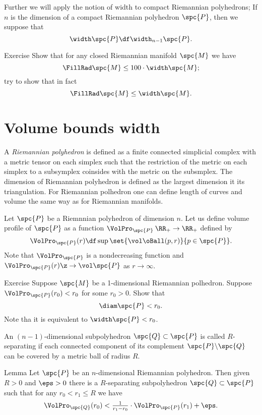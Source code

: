 Further we will apply the notion of width to compact Riemannian polyhedrons;
If $n$ is the dimension of a compact Riemannian polyhedron $\spc{P}$, then 
we suppose that
\[\width\spc{P}\df\width_{n-1}\spc{P}.\]

\begin{thm}{Exercise}
Show that for any closed Riemannian manifold $\spc{M}$ we have
\[\FillRad \spc{M}\le 100\cdot \width\spc{M};\]
try to show that in fact
\[\FillRad \spc{M}\le \width\spc{M}.\]

\end{thm}




\section{Volume bounds width}

A \emph{Riemannian polyhedron} is defined as a finite connected simplicial complex with a metric tensor on each simplex such that the restriction of the metric on each simplex to a subsymplex coinsides with the metric on the subsmplex.
The dimension of Riemannian polyhedron is defined as the largest dimension it its triangulation.
For Riemannian polhedron one can define length of curves and volume the same way as for Riemannian manifolds.

Let $\spc{P}$ be a Riemnnian polyhedron of dimension $n$.
Let us define volume profile of $\spc{P}$ as a function $\VolPro_{\spc{P}}\:\RR_+\to\RR_+$ defined by 
\[\VolPro_{\spc{P}}(r)\df \sup\set{\vol \oBall(p,r)}{p\in\spc{P}}.\]
Note that $\VolPro_{\spc{P}}$ is a nondecreasing function and $\VolPro_{\spc{P}}(r)\z\to\vol\spc{P}$ as $r\to\infty$.

\begin{thm}{Exercise}
Suppose $\spc{M}$ be a 1-dimensional Riemannian polhedron.
Suppose $\VolPro_{\spc{P}}(r_0)<r_0$ for some $r_0>0$.
Show that 
\[\diam \spc{P}<r_0.\]
Note tha it is equivalent to $\width \spc{P}<r_0$.
\end{thm}


An $(n-1)$-dimensional subpolyhedron $\spc{Q}\subset\spc{P}$ is called $R$-separating if each
connected component of its complement $\spc{P}\backslash \spc{Q}$ can be covered by a metric ball of radius $R$.

\begin{thm}{Lemma}
Let $\spc{P}$ be an $n$-dimensional Riemannian polyhedron.
Then given $R>0$ and $\eps>0$ there is a $R$-separating subpolyhedron $\spc{Q}\subset\spc{P}$ such that for any $r_0<r_1\le R$ we have
\[\VolPro_{\spc{Q}}(r_0)< \tfrac1{r_1-r_0}\cdot \VolPro_{\spc{P}}(r_1)+\eps.\]

\end{thm}


